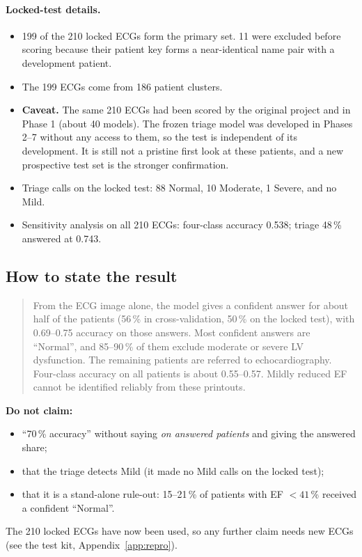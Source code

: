 \paragraph{Locked-test details.}
\begin{itemize}
  \item 199 of the 210 locked ECGs form the primary set. 11 were excluded before scoring because their patient key
    forms a near-identical name pair with a development patient.
  \item The 199 ECGs come from 186 patient clusters.
  \item \textbf{Caveat.} The same 210 ECGs had been scored by the original project and in Phase 1 (about 40 models).
    The frozen triage model was developed in Phases 2--7 without any access to them, so the test is independent of its
    development. It is still not a pristine first look at these patients, and a new prospective test set is the
    stronger confirmation.
  \item Triage calls on the locked test: 88 Normal, 10 Moderate, 1 Severe, and no Mild.
  \item Sensitivity analysis on all 210 ECGs: four-class accuracy 0.538; triage 48\,\% answered at 0.743.
\end{itemize}

\subsection{How to state the result}
\begin{quote}
From the ECG image alone, the model gives a confident answer for about half of the patients (56\,\% in
cross-validation, 50\,\% on the locked test), with 0.69--0.75 accuracy on those answers. Most confident answers are
``Normal'', and 85--90\,\% of them exclude moderate or severe LV dysfunction. The remaining patients are referred to
echocardiography. Four-class accuracy on all patients is about 0.55--0.57. Mildly reduced EF cannot be identified
reliably from these printouts.
\end{quote}

\noindent\textbf{Do not claim:}
\begin{itemize}
  \item ``70\,\% accuracy'' without saying \emph{on answered patients} and giving the answered share;
  \item that the triage detects Mild (it made no Mild calls on the locked test);
  \item that it is a stand-alone rule-out: 15--21\,\% of patients with EF $<41$\,\% received a confident ``Normal''.
\end{itemize}
The 210 locked ECGs have now been used, so any further claim needs new ECGs (see the test kit, Appendix~\ref{app:repro}).
